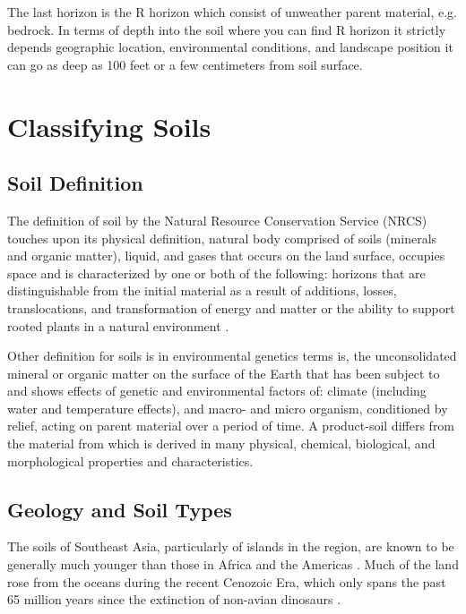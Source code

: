 {\begin{minipage}[c]{.9\textwidth}
The last horizon is the R horizon which consist of unweather parent material, e.g. bedrock. In terms of depth into the soil where you can find R horizon it strictly depends geographic location, environmental conditions, and landscape position it can go as deep as 100 feet or a few centimeters from soil surface. %

\end{minipage}
}

\section{Classifying Soils}

\subsection{Soil Definition}

The definition of soil by the Natural Resource Conservation Service (NRCS) touches upon its physical definition, natural body comprised of soils (minerals and organic matter), liquid, and gases that occurs on the land surface, occupies space and is characterized by one or both of the following: horizons that are distinguishable from the initial material as a result of additions, losses, translocations, and transformation of energy and matter or the ability to support rooted plants in a natural environment \citep{baillie2001soil}. 

Other definition for soils is in environmental genetics terms is, the unconsolidated mineral or organic matter on the surface of the Earth that has been subject to and shows effects of genetic and environmental factors of: climate (including water and temperature effects), and macro- and micro organism, conditioned by relief, acting on parent material over a period of time. A product-soil differs from the material from which is derived in many physical, chemical, biological, and morphological properties and characteristics. 

\subsection{Geology and Soil Types}

The soils of Southeast Asia, particularly of islands in the region, are known to be generally much younger than those in Africa and the Americas \citep{juo2003tropical}. Much of the land rose from the oceans during the recent Cenozoic Era, which only spans the past 65 million years since the extinction of non-avian dinosaurs \citep{hall2002cenozoic}. 

